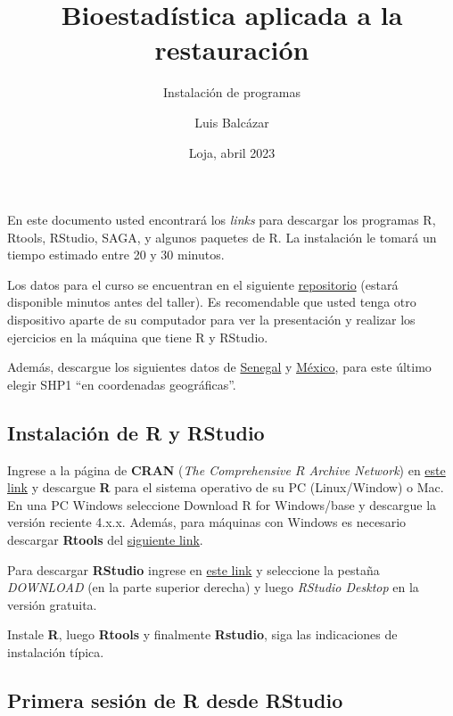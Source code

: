 \documentclass[
]{article}
\title{Bioestadística aplicada a la restauración}
\subtitle{Instalación de programas}
\author{Luis Balcázar}
\date{Loja, abril 2023}
\begin{document}
\maketitle

En este documento usted encontrará los \emph{links} para descargar los
programas R, Rtools, RStudio, SAGA, y algunos paquetes de R. La
instalación le tomará un tiempo estimado entre 20 y 30 minutos.

Los datos para el curso se encuentran en el siguiente
\href{https://github.com/lebalcazar/R_IITCA.git}{repositorio} (estará
disponible minutos antes del taller). Es recomendable que usted tenga
otro dispositivo aparte de su computador para ver la presentación y
realizar los ejercicios en la máquina que tiene R y RStudio.

Además, descargue los siguientes datos de
\href{https://www.dropbox.com/s/tkkqyz2kaqoh4cj/DEM_Senegal.7z?dl=0}{Senegal}
y
\href{http://www.conabio.gob.mx/informacion/metadata/gis/dipoest00gw.xml?_xsl=/db/metadata/xsl/fgdc_html.xsl\&_indent=no}{México},
para este último elegir SHP1 ``en coordenadas geográficas''.

\hypertarget{instalaciuxf3n-de-r-y-rstudio}{%
\subsection{Instalación de R y
RStudio}\label{instalaciuxf3n-de-r-y-rstudio}}

Ingrese a la página de \textbf{CRAN} (\emph{The Comprehensive \(R\)
Archive Network}) en \href{https://cran.r-project.org/}{este link} y
descargue \textbf{R} para el sistema operativo de su PC (Linux/Window) o
Mac. En una PC Windows seleccione Download R for Windows/base y
descargue la versión reciente 4.x.x. Además, para máquinas con Windows
es necesario descargar \textbf{Rtools} del
\href{https://cran.r-project.org/bin/windows/Rtools/}{siguiente link}.

Para descargar \textbf{RStudio} ingrese en
\href{https://rstudio.com/products/rstudio/}{este link} y seleccione la
pestaña \emph{DOWNLOAD} (en la parte superior derecha) y luego
\emph{RStudio Desktop} en la versión gratuita.

Instale \textbf{R}, luego \textbf{Rtools} y finalmente \textbf{Rstudio},
siga las indicaciones de instalación típica.

\hypertarget{primera-sesiuxf3n-de-r-desde-rstudio}{%
\subsection{Primera sesión de R desde
RStudio}\label{primera-sesiuxf3n-de-r-desde-rstudio}}
\end{document}
